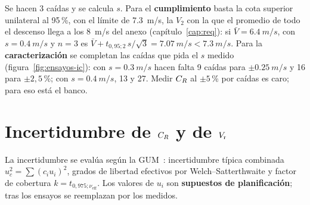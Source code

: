 \begin{resultado}
Se hacen 3 caídas y se calcula $s$. Para el \textbf{cumplimiento} basta la cota superior
unilateral al 95\,\%, con el límite de \SI{7.3}{m/s}, la $V_2$ con la que el promedio de todo el descenso llega a
los \SI{8}{m/s} del anexo (capítulo~\ref{cap:req}): si $\bar V=\SI{6.4}{m/s}$, con $s=\SI{0.4}{m/s}$ y $n=3$ es
$\bar V+t_{0{,}95;2}\,s/\sqrt3=\SI{7.07}{m/s}<\SI{7.3}{m/s}$. Para la
\textbf{caracterización} se completan las caídas que pida el $s$ medido
(figura~\ref{fig:ensayos-ic}): con $s=\SI{0.3}{m/s}$ hacen falta 9 caídas para
$\pm\SI{0.25}{m/s}$ y 16 para $\pm2{,}5$\,\%; con $s=\SI{0.4}{m/s}$, 13 y 27. Medir
$C_{R}$ al $\pm5$\,\% por caídas es caro; para eso está el banco.
\end{resultado}

\section{Incertidumbre de $C_{R}$ y de $V_{\mathrm{r}}$}\label{sec:ensayos-gum}
La incertidumbre se evalúa según la GUM~\cite{ensayos-gum2008}: incertidumbre típica
combinada $u_c^2=\sum(c_i u_i)^2$, grados de libertad efectivos por Welch--Satterthwaite y
factor de cobertura $k=t_{0{,}975;\nu_\text{eff}}$. Los valores de $u_i$ son
\textbf{supuestos de planificación}; tras los ensayos se reemplazan por los medidos.


